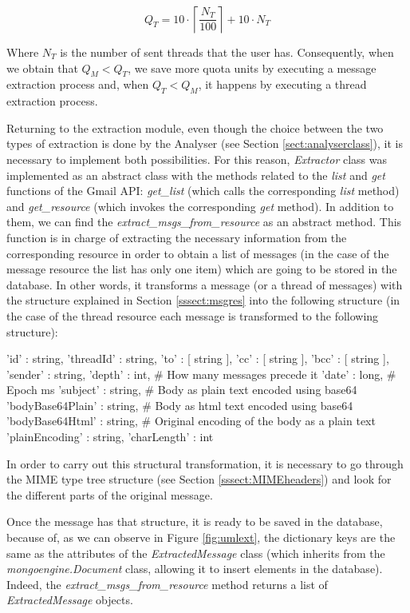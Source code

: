 $$
Q_T = 10\cdot\left\lceil\frac{N_T}{100}\right\rceil+10\cdot N_T
$$

Where $N_T$ is the number of sent threads that the user has. Consequently, when we obtain that $Q_M < Q_T$, we save more quota units by executing a message extraction process and, when $Q_T < Q_M$, it happens by executing a thread extraction process.

Returning to the extraction module, even though the choice between the two types of extraction is done by the Analyser (see Section \ref{sect:analyserclass}), it is necessary to implement both possibilities. For this reason, \textit{Extractor} class was implemented as an abstract class with the methods related to the \textit{list} and \textit{get} functions of the Gmail API: \textit{get\_list} (which calls the corresponding \textit{list} method) and \textit{get\_resource} (which invokes the corresponding \textit{get} method). In addition to them, we can find the \textit{extract\_msgs\_from\_resource} as an abstract method. This function is in charge of extracting the necessary information from the corresponding resource in order to obtain a list of messages (in the case of the message resource the list has only one item) which are going to be stored in the database. In other words, it transforms a message (or a thread of messages) with the structure explained in Section \ref{sssect:msgres} into the following structure (in the case of the thread resource each message is transformed to the following structure):

\begin{python}
{
	'id' : string,
	'threadId' : string,
	'to' : [ string ],
	'cc' : [ string ],
	'bcc' : [ string ],
	'sender' : string,
	'depth' : int,               # How many messages precede it
	'date' : long,               # Epoch ms
	'subject' : string,
	# Body as plain text encoded using base64
	'bodyBase64Plain' : string,
	# Body as html text encoded using base64
	'bodyBase64Html' : string,
	# Original encoding of the body as a plain text
	'plainEncoding' : string,    
	'charLength' : int
}
\end{python}

In order to carry out this structural transformation, it is necessary to go through the MIME type tree structure (see Section \ref{sssect:MIMEheaders}) and look for the different parts of the original message.

Once the message has that structure, it is ready to be saved in the database, because of, as we can observe in Figure \ref{fig:umlext}, the dictionary keys are the same as the attributes of the \textit{ExtractedMessage} class (which inherits from the \textit{mongoengine.Document} class, allowing it to insert elements in the database). Indeed, the \textit{extract\_msgs\_from\_resource} method returns a list of \textit{ExtractedMessage} objects.

